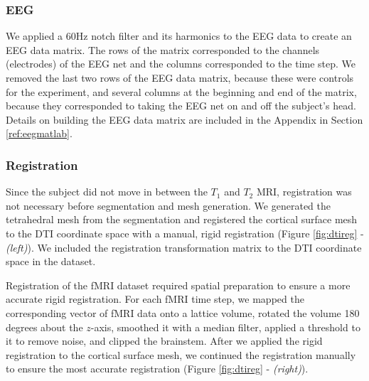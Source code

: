 \subsubsection{EEG}

We applied a 60Hz notch filter and its harmonics \cite{ref:filter} to the EEG data to create an EEG data matrix. The rows of the matrix corresponded to the channels (electrodes) of the EEG net and the columns corresponded to the time step. We removed the last two rows of the EEG data matrix, because these were controls for the experiment, and several columns at the beginning and end of the matrix, because they corresponded to taking the EEG net on and off the subject's head. Details on building the EEG data matrix are included in the Appendix in Section \ref{ref:eegmatlab}. 

\subsubsection{Registration}
\label{sec:reg}

Since the subject did not move in between the $T_1$ and $T_2$ MRI, registration was not necessary before segmentation and mesh generation. We generated the tetrahedral mesh from the segmentation and registered the cortical surface mesh to the DTI coordinate space with a manual, rigid registration (Figure \ref{fig:dtireg} - \textit{(left)}). We included the registration transformation matrix to the DTI coordinate space in the dataset. 

Registration of the fMRI dataset required spatial preparation to ensure a more accurate rigid registration. For each fMRI time step, we mapped the corresponding vector of fMRI data onto a lattice volume, rotated the volume 180 degrees about the $z$-axis, smoothed it with a median filter, applied a threshold to it to remove noise, and clipped the brainstem. After we applied the rigid registration to the cortical surface mesh, we continued the registration manually to ensure the most accurate registration (Figure \ref{fig:dtireg} - \textit{(right)}). 

